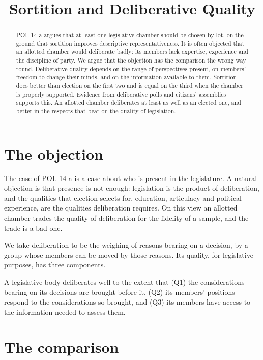\documentclass{situationist-preprint}
\title{Sortition and Deliberative Quality}
\begin{document}
\maketitle

\begin{abstract}
POL-14-a argues that at least one legislative chamber should be chosen by lot, on the ground that sortition improves descriptive representativeness. It is often objected that an allotted chamber would deliberate badly: its members lack expertise, experience and the discipline of party. We argue that the objection has the comparison the wrong way round. Deliberative quality depends on the range of perspectives present, on members' freedom to change their minds, and on the information available to them. Sortition does better than election on the first two and is equal on the third when the chamber is properly supported. Evidence from deliberative polls and citizens' assemblies supports this. An allotted chamber deliberates at least as well as an elected one, and better in the respects that bear on the quality of legislation.
\end{abstract}

\section{The objection}

The case of POL-14-a is a case about who is present in the legislature. A natural objection is that presence is not enough: legislation is the product of deliberation, and the qualities that election selects for, education, articulacy and political experience, are the qualities deliberation requires. On this view an allotted chamber trades the quality of deliberation for the fidelity of a sample, and the trade is a bad one.

We take deliberation to be the weighing of reasons bearing on a decision, by a group whose members can be moved by those reasons. Its quality, for legislative purposes, has three components.

\begin{definition}\label{d:quality}
A legislative body deliberates well to the extent that (Q1) the considerations bearing on its decisions are brought before it, (Q2) its members' positions respond to the considerations so brought, and (Q3) its members have access to the information needed to assess them.
\end{definition}

\section{The comparison}
\end{document}
